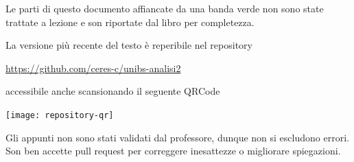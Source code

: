 \documentclass[a4paper,twoside,italian,11pt]{book}
\begin{document}
\cbstart
Le parti di questo documento affiancate da una banda verde non sono state trattate a lezione e son riportate dal libro per completezza.
\cbend

\vfill
\noindent La versione più recente del testo è reperibile nel repository
\begin{center}
	\url{https://github.com/ceres-c/unibs-analisi2}
\end{center}
accessibile anche scansionando il seguente QRCode
\begin{center}
	\texttt{[image: repository-qr]}
\end{center}
Gli appunti non sono stati validati dal professore, dunque non si escludono errori. Son ben accette pull request per correggere inesattezze o migliorare spiegazioni.










\backmatter
{}
\cleardoublepage
{}
\printindex
\end{document}
